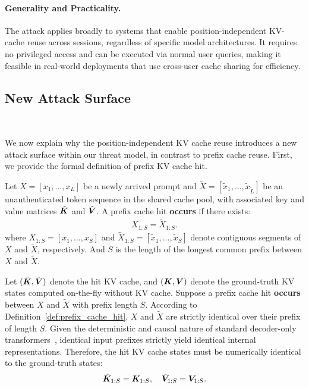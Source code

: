 \paragraph{Generality and Practicality.}
The attack applies broadly to systems that enable position-independent KV-cache reuse across sessions, regardless of specific model architectures. It requires no privileged access and can be executed via normal user queries, making it feasible in real-world deployments that use cross-user cache sharing for efficiency.


\subsection{New Attack Surface}~\label{sec:attack_surface}

We now explain why the position-independent KV cache reuse introduces a new attack surface within our threat model, in contrast to prefix cache reuse. First, we provide the formal definition of prefix KV cache hit. 

\begin{definition}
\label{def:prefix_cache_hit}
Let $X = [x_1, \ldots, x_L]$ be a newly arrived prompt and $\tilde{X} = [\tilde{x}_1, \ldots, \tilde{x}_{\tilde{L}}]$ be an unauthenticated token sequence in the shared cache pool, with associated key and value matrices $\tilde{\bm{K}}$ and $\tilde{\bm{V}}$. A prefix cache hit \textbf{occurs} if there exists:
\begin{align}\label{eq:prefix_match}
    X_{1:S} = \tilde{X}_{1:S}.
\end{align}
where $X_{1:S} = [x_1, \ldots, x_S]$ and $\tilde{X}_{1:S} = [\tilde{x}_1, \ldots, \tilde{x}_S]$ denote contiguous segments of $X$ and $\tilde{X}$, respectively. And $S$ is the length of the longest common prefix between $X$ and $\tilde{X}$.
\end{definition}

Let $(\tilde{\bm{K}}, \tilde{\bm{V}})$ denote the hit KV cache, and $(\bm{K}, \bm{V})$ denote the ground-truth KV states computed on-the-fly without KV cache. Suppose a prefix cache hit \textbf{occurs} between $X$ and $\tilde{X}$ with prefix length $S$. According to Definition~\ref{def:prefix_cache_hit}, $X$ and $\tilde{X}$ are strictly identical over their prefix of length $S$. Given the deterministic and causal nature of standard decoder-only transformers~\cite{vaswani2017attention}, identical input prefixes strictly yield identical internal representations. Therefore, the hit KV cache states must be numerically identical to the ground-truth states:
\begin{align}\label{eq:kv_eq}
    \tilde{\bm{K}}_{1:S} = \bm{K}_{1:S}, \quad \tilde{\bm{V}}_{1:S} = \bm{V}_{1:S}.
\end{align}

